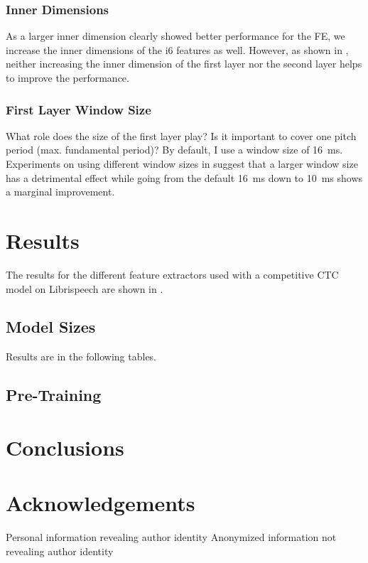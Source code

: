 \documentclass{INTERSPEECH2023}
\begin{document}
\subsubsection{Inner Dimensions}
As a larger inner dimension clearly showed better performance for the \wvtwo \gls{FE}, we increase the inner dimensions of the i6 features as well.
However, as shown in , neither increasing the inner dimension of the first layer nor the second layer helps to improve the performance.

\subsubsection{First Layer Window Size}
What role does the size of the first layer play? Is it important to cover one pitch period (max. fundamental period)?
By default, I use a window size of \SI{16}{\milli\second}.
Experiments on using different window sizes in  suggest that a larger window size has a detrimental effect while going from the default \SI{16}{\milli\second} down to \SI{10}{\milli\second} shows a marginal improvement.

\section{Results}
The results for the different feature extractors used with a competitive \gls{CTC} model on Librispeech are shown in .


\subsection{Model Sizes}
Results are in the following tables.





\subsection{\wvtwo Pre-Training}


\section{Conclusions}

\section{Acknowledgements}

\ifinterspeechfinal
     Personal information revealing author identity
\else
     Anonymized information not revealing author identity
\fi



\end{document}
